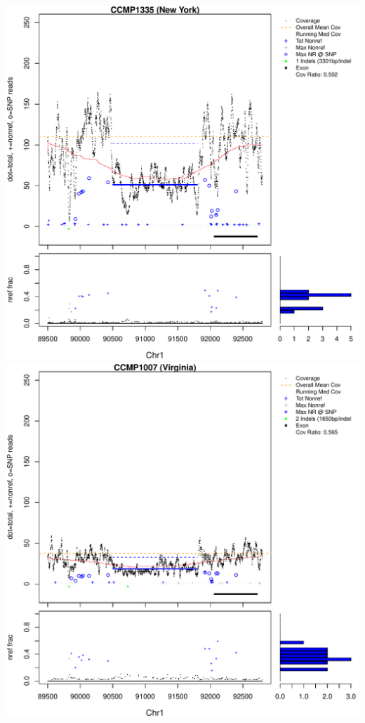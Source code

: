 \documentclass{article}\usepackage[]{graphicx}\usepackage[]{color}
\makeatletter
\def\maxwidth{ %
  \ifdim\Gin@nat@width>\linewidth
    \linewidth
  \else
    \Gin@nat@width
  \fi
}
\newenvironment{knitrout}{}{} %
\makeatother
\begin{document}
\begin{knitrout}
{\centering \includegraphics[width=\maxwidth]{figs-knitr/unnamed-chunk-47-1} 
\includegraphics[width=\maxwidth]{figs-knitr/unnamed-chunk-47-2} 
}
\end{knitrout}
\end{document}
